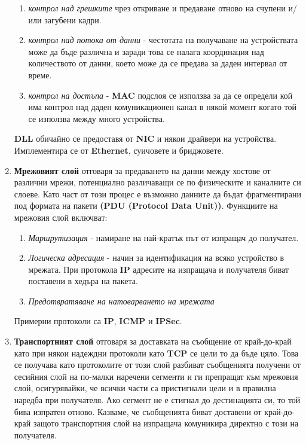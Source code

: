 \documentclass[fleqn,12pt]{article}
\begin{document}
\begin{enumerate}
\begin{enumerate}
        \item \textit{контрол над грешките} чрез откриване и предаване отново на счупени и/или загубени кадри.
        \item \textit{контрол над потока от данни} - честотата на получаване на устройствата може да бъде различна и заради това се налага координация над количеството от данни, което 
        може да се предава за даден интервал от време.
        \item \textit{контрол на достъпа} - \textbf{MAC} подслоя се използва за да се определи кой има контрол над даден комуникационен канал в някой момент когато той се използва между много устройства.
    \end{enumerate}
    \textbf{DLL} обичайно се предоставя от \textbf{NIC} и някои драйвери на устройства. Имплементира се от \textbf{Ethernet}, суичовете и бриджовете.
    \item \textbf{Мрежовият слой} отговаря за предаването на данни между хостове от различни мрежи, потенциално различаващи се по физическите и каналните си слоеве.
    Като част от този процес е възможно данните да бъдат фрагментирани под формата на пакети \textbf{(PDU (Protocol Data Unit))}.
    Функциите на мрежовия слой включват:
    \begin{enumerate}
        \item \textit{Маршрутизация} - намиране на най-кратък път от изпращач до получател.
        \item \textit{Логическа адресация} - начин за идентификация на всяко устройство в мрежата. При протокола \textbf{IP} адресите на изпращача и получателя биват поставени в хедъра на пакета.
        \item \textit{Предотвратяване на натоварването на мрежата}
    \end{enumerate}
    Примерни протоколи са \textbf{IP}, \textbf{ICMP} и \textbf{IPSec}.
    \item \textbf{Транспортният слой} отговаря за доставката на съобщение от край-до-край като при някои надеждни протоколи като \textbf{TCP} се цели то да бъде цяло.
    Това се получава като протоколите от този слой разбиват съобщенията получени от сесийния слой на по-малки наречени сегменти и ги препращат към мрежовия слой,
    осигурявайки, че всички части са пристигнали цели и в правилна наредба при получателя. Ако сегмент не е стигнал до дестинацията си, то той бива изпратен отново.
    Казваме, че съобщенията биват доставени от край-до-край защото транспортния слой на изпращача комуникира директно с този на получателя.

\end{enumerate}
\end{document}
